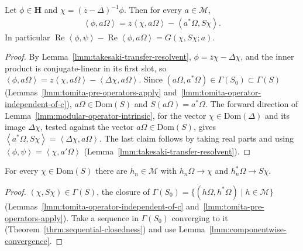 \begin{lemma}
    \label{lmm:takesaki-transfer}
    \leanok
    Let $\phi \in \mathbf{H}$ and $\chi = (\overline{z} - \Delta)^{-1}\phi$. Then for every $a \in \mathcal{M}$,
    \begin{align}
        \left< \phi, a\Omega \right> = z\left< \chi, a\Omega \right> - \left< a^*\Omega, S\chi \right>.
    \end{align}
    In particular $\operatorname{Re}\left< \phi, \psi \right> - \operatorname{Re}\left< \phi, a\Omega \right> = G(\chi, S\chi; a)$.
\end{lemma}
\begin{proof}
    \leanok
    By Lemma~\ref{lmm:takesaki-transfer-resolvent}, $\phi = \overline{z}\chi - \Delta\chi$, and the inner product is conjugate-linear in its first slot, so $\left< \phi, a\Omega \right> = z\left< \chi, a\Omega \right> - \left< \Delta\chi, a\Omega \right>$. Since $(a\Omega, a^*\Omega) \in \Gamma(S_0) \subset \Gamma(S)$ (Lemmas~\ref{lmm:tomita-pre-operators-apply} and~\ref{lmm:tomita-operator-independent-of-c}), $a\Omega \in \text{Dom}(S)$ and $S(a\Omega) = a^*\Omega$. The forward direction of Lemma~\ref{lmm:modular-operator-intrinsic}, for the vector $\chi \in \text{Dom}(\Delta)$ and its image $\Delta\chi$, tested against the vector $a\Omega \in \text{Dom}(S)$, gives $\left< a^*\Omega, S\chi \right> = \left< \Delta\chi, a\Omega \right>$. The last claim follows by taking real parts and using $\left< \phi, \psi \right> = \left< \chi, a'\Omega \right>$ (Lemma~\ref{lmm:takesaki-transfer-resolvent}).
\end{proof}

\begin{lemma}
    \label{lmm:tomita-core}
    \leanok
    For every $\chi \in \text{Dom}(S)$ there are $h_n \in \mathcal{M}$ with $h_n\Omega \to \chi$ and $h_n^*\Omega \to S\chi$.
\end{lemma}
\begin{proof}
    \leanok
    $(\chi, S\chi) \in \Gamma(S)$, the closure of $\Gamma(S_0) = \{ (h\Omega, h^*\Omega) \mid h \in \mathcal{M} \}$ (Lemmas~\ref{lmm:tomita-operator-independent-of-c} and~\ref{lmm:tomita-pre-operators-apply}). Take a sequence in $\Gamma(S_0)$ converging to it (Theorem~\ref{thrm:sequential-closedness}) and use Lemma~\ref{lmm:componentwise-convergence}.
\end{proof}


